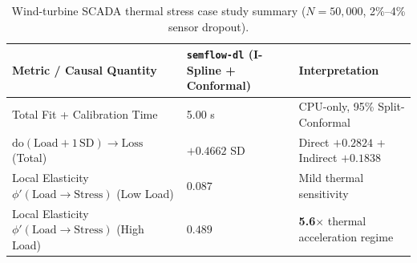 \begin{table}[t]
  \centering
  \caption{Wind-turbine SCADA thermal stress case study summary ($N = 50{,}000$, 2\%--4\% sensor dropout).}
  \label{tab:scada-case}
  \small
  \begin{tabular}{lll}
    \hline
    Metric / Causal Quantity & \texttt{semflow-dl} (I-Spline + Conformal) & Interpretation \\
    \hline
    Total Fit + Calibration Time & 5.00 s & CPU-only, 95\% Split-Conformal \\
    $\mathrm{do}(\mathrm{Load} + 1\,\mathrm{SD}) \to \mathrm{Loss}$ (Total) & $+0.4662$ SD & Direct $+0.2824$ + Indirect $+0.1838$ \\
    Local Elasticity $\phi'(\mathrm{Load} \to \mathrm{Stress})$ (Low Load) & $0.087$ & Mild thermal sensitivity \\
    Local Elasticity $\phi'(\mathrm{Load} \to \mathrm{Stress})$ (High Load) & $0.489$ & \textbf{5.6$\times$} thermal acceleration regime \\
    \hline
  \end{tabular}
\end{table}
